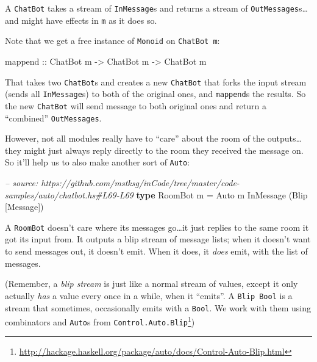\documentclass[]{article}
\newenvironment{Shaded}{}{}
\newcommand{\KeywordTok}[1]{\textcolor[rgb]{0.00,0.44,0.13}{\textbf{#1}}}
\newcommand{\DataTypeTok}[1]{\textcolor[rgb]{0.56,0.13,0.00}{#1}}
\newcommand{\CommentTok}[1]{\textcolor[rgb]{0.38,0.63,0.69}{\textit{#1}}}
\newcommand{\OtherTok}[1]{\textcolor[rgb]{0.00,0.44,0.13}{#1}}
\newcommand{\FunctionTok}[1]{\textcolor[rgb]{0.02,0.16,0.49}{#1}}
\newcommand{\NormalTok}[1]{#1}
\renewcommand{\href}[2]{#2\footnote{\url{#1}}}
\begin{document}
A \texttt{ChatBot} takes a stream of \texttt{InMessage}s and returns a stream of
\texttt{OutMessages}s\ldots{}and might have effects in \texttt{m} as it does so.

Note that we get a free instance of \texttt{Monoid} on \texttt{ChatBot\ m}:

\begin{Shaded}
\begin{Highlighting}[]
\NormalTok{mappend}\OtherTok{ ::} \DataTypeTok{ChatBot}\NormalTok{ m }\OtherTok{->} \DataTypeTok{ChatBot}\NormalTok{ m }\OtherTok{->} \DataTypeTok{ChatBot}\NormalTok{ m}
\end{Highlighting}
\end{Shaded}

That takes two \texttt{ChatBot}s and creates a new \texttt{ChatBot} that forks
the input stream (sends all \texttt{InMessage}s) to both of the original ones,
and \texttt{mappend}s the results. So the new \texttt{ChatBot} will send message
to both original ones and return a ``combined'' \texttt{OutMessages}.

However, not all modules really have to ``care'' about the room of the
outputs\ldots{}they might just always reply directly to the room they received
the message on. So it'll help us to also make another sort of \texttt{Auto}:

\begin{Shaded}
\begin{Highlighting}[]
\CommentTok{-- source: https://github.com/mstksg/inCode/tree/master/code-samples/auto/chatbot.hs#L69-L69}
\KeywordTok{type} \DataTypeTok{RoomBot}\NormalTok{ m }\FunctionTok{=} \DataTypeTok{Auto}\NormalTok{ m }\DataTypeTok{InMessage}\NormalTok{ (}\DataTypeTok{Blip}\NormalTok{ [}\DataTypeTok{Message}\NormalTok{])}
\end{Highlighting}
\end{Shaded}

A \texttt{RoomBot} doesn't care where its messages go\ldots{}it just replies to
the same room it got its input from. It outputs a blip stream of message lists;
when it doesn't want to send messages out, it doesn't emit. When it does, it
\emph{does} emit, with the list of messages.

(Remember, a \emph{blip stream} is just like a normal stream of values, except
it only actually \emph{has} a value every once in a while, when it ``emits''. A
\texttt{Blip\ Bool} is a stream that sometimes, occasionally emits with a
\texttt{Bool}. We work with them using combinators and \texttt{Auto}s from
\href{http://hackage.haskell.org/package/auto/docs/Control-Auto-Blip.html}{\texttt{Control.Auto.Blip}})
\end{document}

